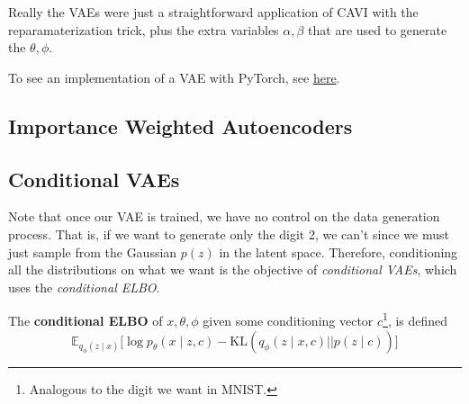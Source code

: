   Really the VAEs were just a straightforward application of CAVI with the reparamaterization trick, plus the extra variables $\alpha, \beta$ that are used to generate the $\theta, \phi$. 

  \begin{algo}
    To see an implementation of a VAE with PyTorch, see \href{code/vae.html}{here}. 
  \end{algo} 

\subsection{Importance Weighted Autoencoders}

\subsection{Conditional VAEs}

  Note that once our VAE is trained, we have no control on the data generation process. That is, if we want to generate only the digit 2, we can't since we must just sample from the Gaussian $p(z)$ in the latent space. Therefore, conditioning all the distributions on what we want is the objective of \textit{conditional VAEs}, which uses the \textit{conditional ELBO}. 

  \begin{definition}
    The \textbf{conditional ELBO} of $x, \theta, \phi$ given some conditioning vector $c$\footnote{Analogous to the digit we want in MNIST.}, is defined 
    \begin{equation}
      \mathbb{E}_{q_\phi(z \mid x)} \big[ \log p_\theta(x \mid z,c) - \mathrm{KL}(q_\phi (z \mid x,c) || p(z \mid c)) \big] 
    \end{equation}
  \end{definition}


